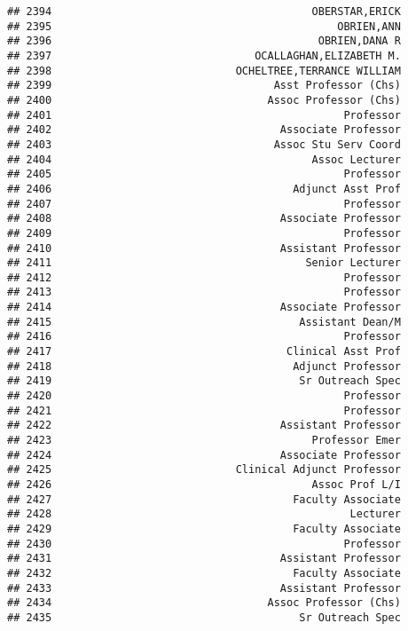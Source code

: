 \documentclass[
]{article}
\begin{document}
\begin{verbatim}
## 2394                                         OBERSTAR,ERICK
## 2395                                             OBRIEN,ANN
## 2396                                          OBRIEN,DANA R
## 2397                                OCALLAGHAN,ELIZABETH M.
## 2398                             OCHELTREE,TERRANCE WILLIAM
## 2399                                   Asst Professor (Chs)
## 2400                                  Assoc Professor (Chs)
## 2401                                              Professor
## 2402                                    Associate Professor
## 2403                                   Assoc Stu Serv Coord
## 2404                                         Assoc Lecturer
## 2405                                              Professor
## 2406                                      Adjunct Asst Prof
## 2407                                              Professor
## 2408                                    Associate Professor
## 2409                                              Professor
## 2410                                    Assistant Professor
## 2411                                        Senior Lecturer
## 2412                                              Professor
## 2413                                              Professor
## 2414                                    Associate Professor
## 2415                                       Assistant Dean/M
## 2416                                              Professor
## 2417                                     Clinical Asst Prof
## 2418                                      Adjunct Professor
## 2419                                       Sr Outreach Spec
## 2420                                              Professor
## 2421                                              Professor
## 2422                                    Assistant Professor
## 2423                                         Professor Emer
## 2424                                    Associate Professor
## 2425                             Clinical Adjunct Professor
## 2426                                         Assoc Prof L/I
## 2427                                      Faculty Associate
## 2428                                               Lecturer
## 2429                                      Faculty Associate
## 2430                                              Professor
## 2431                                    Assistant Professor
## 2432                                      Faculty Associate
## 2433                                    Assistant Professor
## 2434                                  Assoc Professor (Chs)
## 2435                                       Sr Outreach Spec

\end{verbatim}
\end{document}
